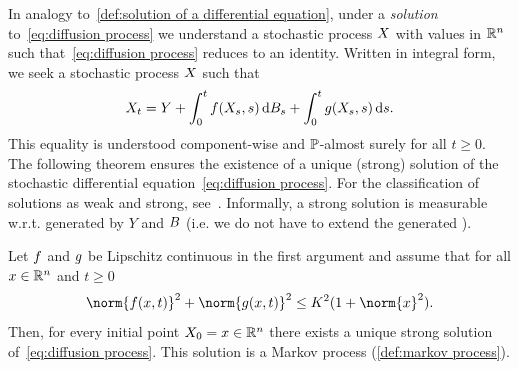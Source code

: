 In analogy to~\cref{def:solution of a differential equation}, under a \emph{solution} to~\cref{eq:diffusion process} we understand a stochastic process \( X \) with values in \( \mathbb{R}^n \) such that~\cref{eq:diffusion process} reduces to an identity.
Written in integral form, we seek a stochastic process \( X \) such that
\begin{equation}
	X_t = Y + \int_{\num{0}}^tf(X_s, s)\,\mathrm{d}B_s + \int_{\num{0}}^t g(X_s, s)\,\mathrm{d}s.
\end{equation}
This equality is understood component-wise and \( \mathbb{P} \)-almost surely for all \( t \geq \num{0} \).
The following theorem ensures the existence of a unique (strong) solution of the stochastic differential equation~\cref{eq:diffusion process}.
For the classification of solutions as weak and strong, see~\cite[Definition 26.1]{Klenke2014}.
Informally, a strong solution is measurable w.r.t. \SigmaAlgebras{} generated by \( Y \) and \( B \) (i.e. we do not have to extend the generated \SigmaAlgebras).
\begin{theorem}%
	\label{th:unique strong solution}
	Let \( f \) and \( g \) be Lipschitz continuous in the first argument and assume that for all \( x \in \mathbb{R}^n \) and \( t \geq \num{0} \)
	\begin{equation}
		\norm{\DiffusionCoefficient(x, t)}^{\num{2}} + \norm{\Drift(x, t)}^{\num{2}} \leq K^{\num{2}} (1 + \norm{x}^{\num{2}}).
	\end{equation}
	Then, for every initial point \( X_{\num{0}} = x \in \mathbb{R}^n \) there exists a unique strong solution of~\cref{eq:diffusion process}.
	This solution is a Markov process (\cref{def:markov process}).
\end{theorem}

